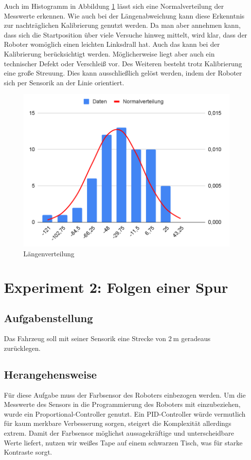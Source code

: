 \documentclass[ngerman]{tudscrreprt}
\begin{document}
Auch im Histogramm in Abbildung \ref{figure:breitenverteilung} lässt sich eine Normalverteilung der Messwerte erkennen. Wie auch bei der Längenabweichung kann diese Erkenntnis zur nachträglichen Kalibrierung genutzt werden. Da man aber annehmen kann, dass sich die Startposition über viele Versuche hinweg mittelt, wird klar, dass der Roboter womöglich einen leichten Linksdrall hat. Auch das kann bei der Kalibrierung berücksichtigt werden. Möglicherweise liegt aber auch ein technischer Defekt oder Verschleiß vor. Des Weiteren besteht trotz Kalibrierung eine große Streuung. Dies kann ausschließlich gelöst werden, indem der Roboter sich per Sensorik an der Linie orientiert. 
%
\begin{figure}[H]
    \centering
    \includegraphics[scale=0.5]{images/breitenverteilung.png}
    \caption{Längenverteilung}
    \label{figure:breitenverteilung}
\end{figure}

\section{Experiment 2: Folgen einer Spur}
\subsection{Aufgabenstellung}
Das Fahrzeug soll mit seiner Sensorik eine Strecke von $\SI{2}{\m}$ geradeaus zurücklegen.

\subsection{Herangehensweise}
Für diese Aufgabe muss der Farbsensor des Roboters einbezogen werden. Um die Messwerte des Sensors in die Programmierung des Roboters mit einzubeziehen, wurde ein Proportional-Controller genutzt. Ein PID-Controller würde vermutlich für kaum merkbare Verbesserung sorgen, steigert die Komplexität allerdings extrem. Damit der Farbsensor möglichst aussagekräftige und unterscheidbare Werte liefert, nutzen wir weißes Tape auf einem schwarzen Tisch, was für starke Kontraste sorgt.
\end{document}
